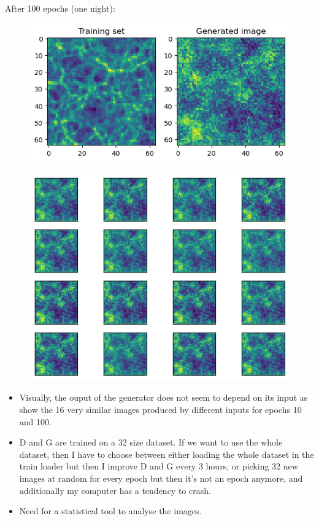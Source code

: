 \documentclass[11pt,a4paper]{report}
\begin{document}
\begin{multicols*}{2}
    After 100 epochs (one night):
    \begin{figure}[H]
        \centering
        \includegraphics[width = .9\linewidth]{./figure/100epochs_32batch.png}
    \end{figure}
    \begin{figure}[H]
        \centering
        \includegraphics[width = .9\linewidth]{./figure/100epochs_32batch_queblo.png}
    \end{figure}



    \begin{itemize}
        \item Visually, the ouput of the generator does not seem to depend on its input as show the 16 very similar images produced by different inputs for epochs 10 and 100.
        \item D and G are trained on a 32 size dataset. If we want to use the whole dataset, then I have to choose between either loading the whole dataset in the train loader but then I improve D and G every 3 hours, or  picking 32 new images at random for every epoch but then it's not an epoch anymore, and additionally my computer has a tendency to crash.
        \item Need for a statistical tool to analyse the images.
    \end{itemize}


\end{multicols*}
\end{document}

